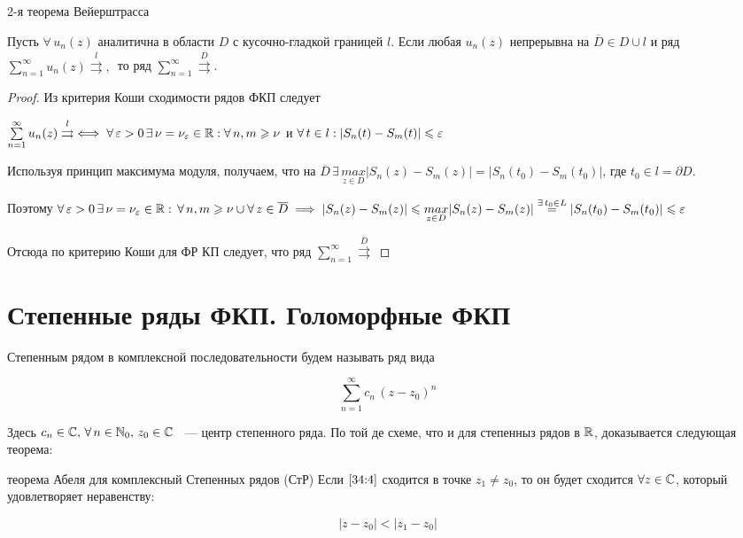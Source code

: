 \documentclass[../../main.tex]{subfiles}
\begin{document}
\begin{thm}{2-я теорема Вейерштрасса}
	\;
	
	Пусть $ \forall\, u_n(z) $ аналитична в области $ D $ с кусочно-гладкой 
	границей $ l $. Если любая $ u_n(z) $ непрерывна на $ \overline{D} \in D \cup 
	l $ и ряд $ \sum\limits_{n = 1}^{\infty} u_n(z) 
	\overset{l}\rightrightarrows,\, $ то ряд $ \sum\limits_{n = 1}^{\infty} 
	\overset{\overline{D}}\rightrightarrows $.
\end{thm}

\begin{proof}
	Из критерия Коши сходимости рядов ФКП следует
	
	$ \sum\limits_{n = 1}^{\infty} u_n(z) \overset{l}\rightrightarrows \iff 
	\forall\, \varepsilon > 0\, \exists\, \nu = \nu_\varepsilon \in \mathbb{R} : \forall\, n, m \geqslant 
	\nu $ и $ \forall\, t \in l : |S_n(t) - S_m(t)| \leqslant \varepsilon $
	
	Используя принцип максимума модуля, получаем, что на $ \overline{D}\, 
	\exists\, \underset{z \in D}{max}|S_n(z) - S_m(z)| = |S_n(t_0) - S_m(t_0)| $, 
	где $ t_0 \in l = \partial D $.
	
	Поэтому $ \forall\, \varepsilon > 0\, \exists\, \nu = \nu_\varepsilon \in \mathbb{R} :\, \forall\, 
	n, m \geqslant \nu \cup \forall\, z \in \overline{D} \implies |S_n(z) - S_m(z)| 
	\leqslant \underset{z \in D}{max}|S_n(z) - S_m(z)| \overset{\exists\, t_0 \in L}= 
	|S_n(t_0) - S_m(t_0)| \leqslant \varepsilon $ 
	
	Отсюда по критерию Коши для ФР КП следует, что ряд $ \sum\limits_{n = 
	1}^{\infty} \overset{\overline{D}}\rightrightarrows $
\end{proof}

\section{Степенные ряды ФКП. Голоморфные ФКП}

Степенным рядом в комплексной последовательности будем называть ряд вида

\begin{equation}\label{34:4}
	\sum\limits_{n = 1}^{\infty} c_n\, (z - z_0)^n
\end{equation}

Здесь $ c_n \in \mathbb{C},\, \forall\, n \in \mathbb{N}_0,\, z_0 \in \mathbb{C} $ ~--- центр 
степенного ряда. По той де схеме, что и для степенныз рядов в $ \mathbb{R} $, 
доказывается следующая теорема:

\begin{thm}{теорема Абеля для комплексный Степенных рядов (СтР)}
	Если $ \eqref{34:4} $ сходится в точке $ z_1 \neq z_0 $, то он будет сходится 
	$ \forall z \in \mathbb{C} $, который удовлетворяет неравенству:
	
	\[ |z - z_0| < |z_1 - z_0| \]
\end{thm}
\end{document}
